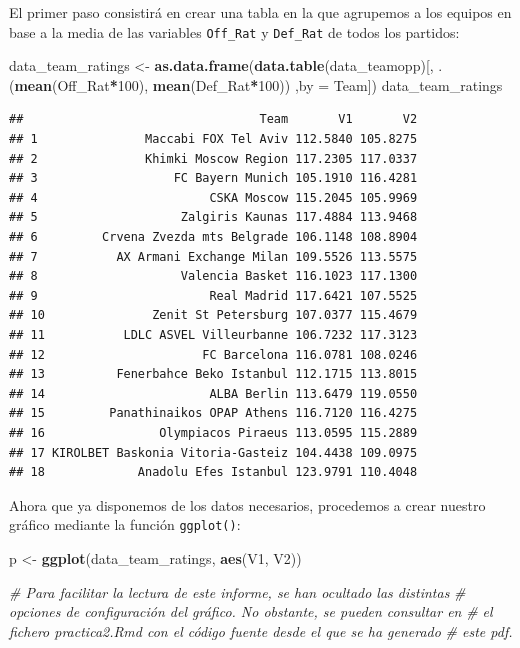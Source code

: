\documentclass[
]{article}
\newenvironment{Shaded}{\begin{snugshade}}{\end{snugshade}}
\newcommand{\CommentTok}[1]{\textcolor[rgb]{0.56,0.35,0.01}{\textit{#1}}}
\newcommand{\DataTypeTok}[1]{\textcolor[rgb]{0.13,0.29,0.53}{#1}}
\newcommand{\DecValTok}[1]{\textcolor[rgb]{0.00,0.00,0.81}{#1}}
\newcommand{\KeywordTok}[1]{\textcolor[rgb]{0.13,0.29,0.53}{\textbf{#1}}}
\newcommand{\NormalTok}[1]{#1}
\newcommand{\OperatorTok}[1]{\textcolor[rgb]{0.81,0.36,0.00}{\textbf{#1}}}
\newcommand{\StringTok}[1]{\textcolor[rgb]{0.31,0.60,0.02}{#1}}
\begin{document}
El primer paso consistirá en crear una tabla en la que agrupemos a los
equipos en base a la media de las variables \texttt{Off\_Rat} y
\texttt{Def\_Rat} de todos los partidos:

\begin{Shaded}
\begin{Highlighting}[]
\NormalTok{data_team_ratings <-}\StringTok{ }\KeywordTok{as.data.frame}\NormalTok{(}\KeywordTok{data.table}\NormalTok{(data_teamopp)[, .(}\KeywordTok{mean}\NormalTok{(Off_Rat}\OperatorTok{*}\DecValTok{100}\NormalTok{), }
                                                                \KeywordTok{mean}\NormalTok{(Def_Rat}\OperatorTok{*}\DecValTok{100}\NormalTok{))}
\NormalTok{                                                            ,}\DataTypeTok{by =}\NormalTok{ Team])}
\NormalTok{data_team_ratings}
\end{Highlighting}
\end{Shaded}

\begin{verbatim}
##                                 Team       V1       V2
## 1               Maccabi FOX Tel Aviv 112.5840 105.8275
## 2               Khimki Moscow Region 117.2305 117.0337
## 3                   FC Bayern Munich 105.1910 116.4281
## 4                        CSKA Moscow 115.2045 105.9969
## 5                    Zalgiris Kaunas 117.4884 113.9468
## 6         Crvena Zvezda mts Belgrade 106.1148 108.8904
## 7           AX Armani Exchange Milan 109.5526 113.5575
## 8                    Valencia Basket 116.1023 117.1300
## 9                        Real Madrid 117.6421 107.5525
## 10               Zenit St Petersburg 107.0377 115.4679
## 11           LDLC ASVEL Villeurbanne 106.7232 117.3123
## 12                      FC Barcelona 116.0781 108.0246
## 13          Fenerbahce Beko Istanbul 112.1715 113.8015
## 14                       ALBA Berlin 113.6479 119.0550
## 15         Panathinaikos OPAP Athens 116.7120 116.4275
## 16                Olympiacos Piraeus 113.0595 115.2889
## 17 KIROLBET Baskonia Vitoria-Gasteiz 104.4438 109.0975
## 18             Anadolu Efes Istanbul 123.9791 110.4048
\end{verbatim}

Ahora que ya disponemos de los datos necesarios, procedemos a crear
nuestro gráfico mediante la función \texttt{ggplot()}:

\begin{Shaded}
\begin{Highlighting}[]
\NormalTok{p <-}\StringTok{ }\KeywordTok{ggplot}\NormalTok{(data_team_ratings, }\KeywordTok{aes}\NormalTok{(V1, V2))}

\CommentTok{# Para facilitar la lectura de este informe, se han ocultado las distintas }
\CommentTok{# opciones de configuración del gráfico. No obstante, se pueden consultar en}
\CommentTok{# el fichero practica2.Rmd con el código fuente desde el que se ha generado}
\CommentTok{# este pdf.}
\end{Highlighting}
\end{Shaded}
\end{document}
